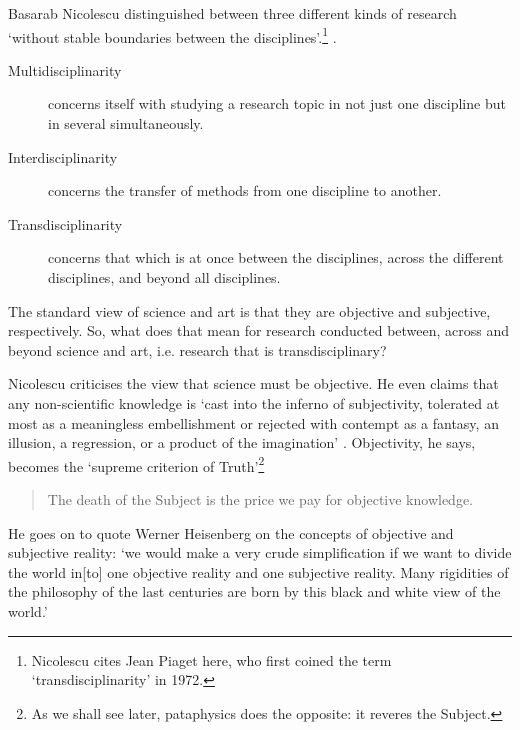 Basarab Nicolescu distinguished between three different kinds of research `without stable boundaries between the disciplines'.\footnote{Nicolescu cites Jean Piaget here, who first coined the term `transdisciplinarity' in 1972.} \autocite{Nicolescu2010}.

\begin{description}
  \item [Multidisciplinarity]	concerns itself with studying a research topic in not just one discipline but in several simultaneously.
  \item [Interdisciplinarity]	concerns the transfer of methods from one discipline to another.
  \item [Transdisciplinarity]	concerns that which is at once between the disciplines, across the different disciplines, and beyond all disciplines.
\end{description}

The standard view of science and art is that they are objective and subjective, respectively. So, what does that mean for research conducted between, across and beyond science and art, i.e. research that is transdisciplinary?

Nicolescu criticises the view that science must be objective. He even claims that any non-scientific knowledge is `cast into the inferno of subjectivity, tolerated at most as a meaningless embellishment or rejected with contempt as a fantasy, an illusion, a regression, or a product of the imagination' \autocite{Nicolescu2010}. Objectivity, he says, becomes the `supreme criterion of Truth'\footnote{As we shall see later, pataphysics does the opposite: it reveres the Subject.}

\begin{quotation}
  The death of the Subject is the price we pay for objective knowledge. 
\end{quotation}

He goes on to quote Werner Heisenberg on the concepts of objective and subjective reality: `we would make a very crude simplification if we want to divide the world in[to] one objective reality and one subjective reality. Many rigidities of the philosophy of the last centuries are born by this black and white view of the world.' \autocite[Heisenberg, cited in][]{Nicolescu2010}

